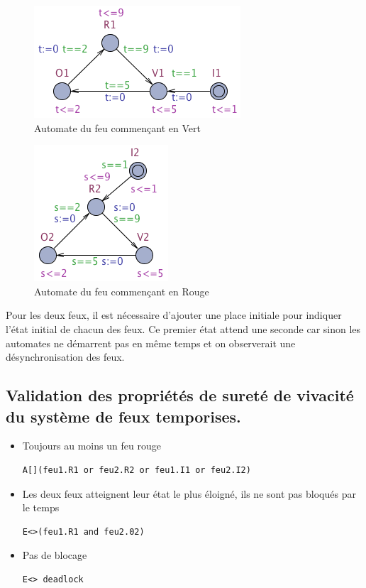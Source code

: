 \documentclass[11pt]{article}
\begin{document}
\begin{figure}[H]
	\centering
	\includegraphics{ressources/part2/Q7-1.png}
	\caption{Automate du feu commençant en Vert}
\end{figure}

\begin{figure}[H]
	\centering
	\includegraphics{ressources/part2/Q7-2.png}
	\caption{Automate du feu commençant en Rouge}
\end{figure}

Pour les deux feux, il est nécessaire d'ajouter une place initiale pour indiquer l'état initial de chacun des feux. Ce premier état attend une seconde car sinon les automates ne démarrent pas en même temps et on observerait une désynchronisation des feux.


\subsection*{Validation des propriétés de sureté de vivacité du système de feux temporises.}

\begin{itemize}
	\item Toujours au moins un feu rouge
\begin{verbatim}
A[](feu1.R1 or feu2.R2 or feu1.I1 or feu2.I2)
\end{verbatim}

	\item Les deux feux atteignent leur état le plus éloigné, ils ne sont pas bloqués par le temps
\begin{verbatim}
E<>(feu1.R1 and feu2.02)	
\end{verbatim}

	\item Pas de blocage
\begin{verbatim}
E<> deadlock
\end{verbatim}

\end{itemize}
\end{document}
